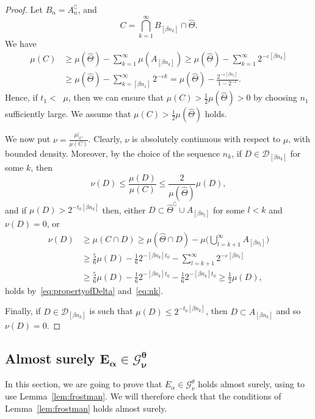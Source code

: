 \documentclass[10pt]{amsart}
\theoremstyle{definition}\newtheorem{defi}[theo]{Definition}\newtheorem{rema}[theo]{Remark}\newtheorem{exam}[theo]{Example}\newtheorem{exem}[theo]{Example}\newtheorem{nota}[theo]{Notation}
\DeclareMathOperator{\udimh}{\overline{dim}_H}
\begin{document}
\begin{proof}
Let $B_n = A_n^\complement$, and
\[
C = \bigcap_{k=1}^\infty B_{[\beta n_k]} \cap \hat{\Theta}.
\]
We have
\begin{align*}
\mu (C) &\geq \mu (\hat{\Theta}) - \sum_{k=1}^\infty \mu (A_{[\beta n_k]}) \geq \mu (\hat{\Theta}) - \sum_{k=1}^\infty 2^{-
\varepsilon [\beta n_k]} \\ &\geq \mu (\hat{\Theta}) -
\sum_{k=[\beta n_1]}^\infty 2^{-\varepsilon k} = \mu (\hat{\Theta}) - \frac{2^{-\varepsilon [\beta n_1]}}{1 - 2^{-\varepsilon}}.
\end{align*}
Hence, if $t_1 < \udimh \mu$, then we can ensure that $\mu (C) >
\frac{1}{2} \mu (\hat{\Theta}) > 0$ by choosing $n_1$ sufficiently large. We assume that $\mu (C) > \frac{1}{2} \mu (\hat{\Theta})$ holds.

We now put $\nu = \frac{\mu|_C}{\mu (C)}$. Clearly, $\nu$ is absolutely continuous with respect to $\mu$, with bounded density. Moreover, by the choice of the sequence $n_k$, if $D \in
\mathscr{D}_{[\beta n_k]}$ for some $k$, then
\[
\nu (D) \leq \frac{\mu (D)}{\mu (C)} \leq \frac{2}{\mu(\hat{\Theta})}
\mu (D),
\]
and if $\mu (D) > 2^{- t_0 [\beta n_k]}$ then, either $D \subset
\hat{\Theta}^\complement \cup A_{[\beta n_l]}$ for some $l < k$ and $\nu (D) = 0$, or
\begin{align*}
\nu (D) &\geq \mu (C \cap D) \geq \mu (\hat{\Theta} \cap D) - \mu
\biggl(\bigcup_{l = k+1}^\infty A_{[\beta n_l]} \biggr) \\ &\geq
\frac{5}{6} \mu (D) - \frac{1}{6} 2^{-[\beta n_k]t_0} -
\sum_{l=k+1}^\infty 2^{-\varepsilon [\beta n_l]} \\ &\geq
\frac{5}{6} \mu (D) - \frac{1}{6} 2^{-[\beta n_k]t_0} -
\frac{1}{6} 2^{-[\beta n_k] t_0} \geq \frac{1}{2} \mu (D),
\end{align*}
holds by~\eqref{eq:propertyofDelta} and~\eqref{eq:nk}.

Finally, if $D \in \mathscr{D}_{[\beta n_k]}$ is such that $\mu (D)
\leq 2^{- t_0 [\beta n_k]}$, then $D \subset A_{[\beta n_k]}$ and so $\nu (D) = 0$.
\end{proof}

\subsection{Almost surely \texorpdfstring{$\boldsymbol{E_\alpha \in \mathscr{G}_\nu^\theta}$}{}}

In this section, we are going to prove that $E_\alpha \in
\mathscr{G}_\nu^\theta$ holds almost surely, using to use Lemma~\ref{lem:frostman}. We will therefore check that the conditions of Lemma~\ref{lem:frostman} holds almost surely.
\end{document}
